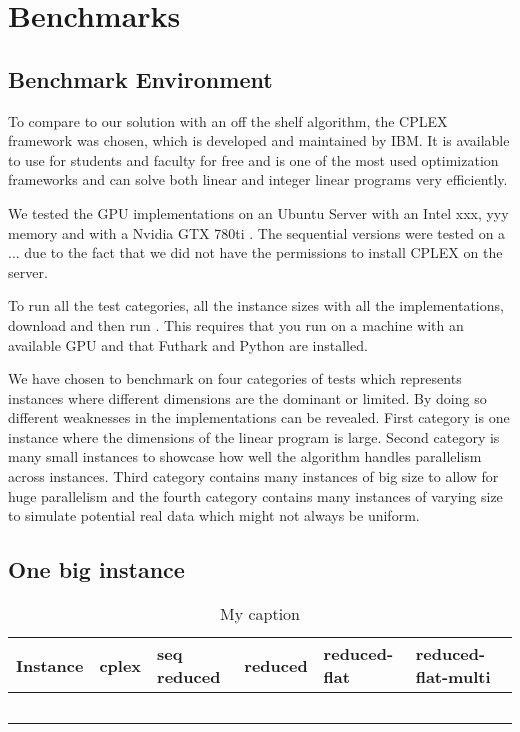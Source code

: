 \section{Benchmarks}
\subsection{Benchmark Environment}
To compare to our solution with an off the shelf algorithm, the CPLEX framework was chosen, which is developed and maintained by IBM. It is available to use for students and faculty for free and is one of the most used optimization frameworks and can solve both linear and integer linear programs very efficiently.

We tested the GPU implementations on an Ubuntu  Server with an Intel xxx, yyy memory and with a Nvidia GTX 780ti . The sequential versions were tested on a ... due to the fact that we did not have the permissions to install CPLEX on the server.

To run all the test categories, all the instance sizes with all the implementations, download  and then run . This requires that you run on a machine with an available GPU and that Futhark and Python are installed.

We have chosen to benchmark on four categories of tests which represents instances where different dimensions are the dominant or limited. By doing so different weaknesses in the implementations can be revealed. First category is one instance where the dimensions of the linear program is large. Second category is many small instances to showcase how well the algorithm handles parallelism across instances. Third category contains many instances of big size to allow for huge parallelism and the fourth category contains many instances of varying size to simulate potential real data which might not always be uniform. 

\subsection{One big instance}
\begin{table}[H]
	\centering
	\label{table:one-big-instance}
	\begin{tabular}{|l|l|l|l|l|l|}\hline
		Instance & cplex & seq reduced & reduced & reduced-flat & reduced-flat-multi \\\hline
		&       &             &         &              &                    \\\hline
		&       &             &         &              &                    \\\hline
		&       &             &         &              &                   \\\hline
		&       &             &         &              &                   \\\hline
		&       &             &         &              &                   \\\hline
	\end{tabular}
	\caption{My caption}
\end{table}

